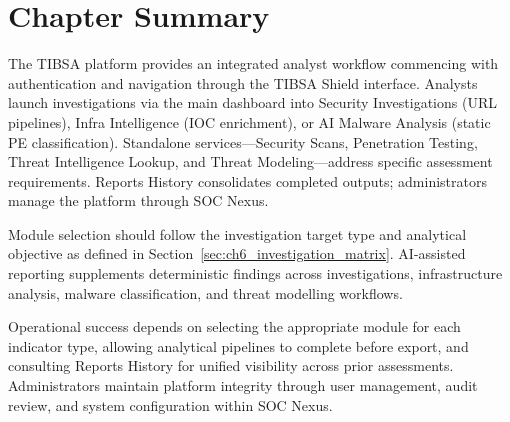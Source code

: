 \section{Chapter Summary}

The TIBSA platform provides an integrated analyst workflow commencing with authentication and navigation through the TIBSA Shield interface. Analysts launch investigations via the main dashboard into Security Investigations (URL pipelines), Infra Intelligence (IOC enrichment), or AI Malware Analysis (static PE classification). Standalone services---Security Scans, Penetration Testing, Threat Intelligence Lookup, and Threat Modeling---address specific assessment requirements. Reports History consolidates completed outputs; administrators manage the platform through SOC Nexus.

Module selection should follow the investigation target type and analytical objective as defined in Section~\ref{sec:ch6_investigation_matrix}. AI-assisted reporting supplements deterministic findings across investigations, infrastructure analysis, malware classification, and threat modelling workflows.

Operational success depends on selecting the appropriate module for each indicator type, allowing analytical pipelines to complete before export, and consulting Reports History for unified visibility across prior assessments. Administrators maintain platform integrity through user management, audit review, and system configuration within SOC Nexus.

